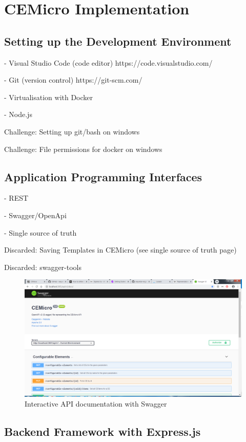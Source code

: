 \chapter{CEMicro Implementation}
\label{sec:impl}


\section{Setting up the Development Environment}

- Visual Studio Code (code editor) https://code.visualstudio.com/

- Git (version control) https://git-scm.com/

- Virtualisation with Docker

- Node.js

Challenge: Setting up git/bash on windows

Challenge: File permissions for docker on windows


\section{Application Programming Interfaces}

- REST

- Swagger/OpenApi

- Single source of truth

Discarded: Saving Templates in CEMicro (see single source of truth page)

Discarded: swagger-tools

\begin{figure}
  \centering
  \includegraphics[width=0.8\linewidth]{assets/swagger-api-docs.png}
  \caption{Interactive API documentation with Swagger}
  \label{fig:api-docs}
\end{figure}


\section{Backend Framework with Express.js}


